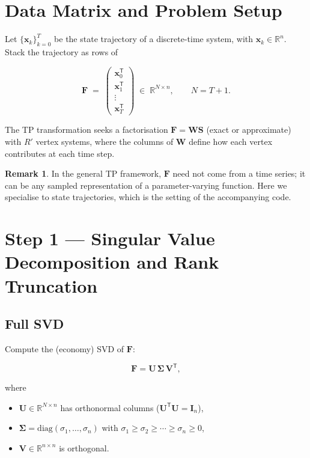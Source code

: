 \documentclass[11pt]{article}
\theoremstyle{definition}
\newtheorem{remark}{Remark}[section]
\theoremstyle{plain}
\newcommand{\R}{\mathbb{R}}
\newcommand{\mat}[1]{\mathbf{#1}}
\newcommand{\T}{\mathsf{T}}
\begin{document}
\section{Data Matrix and Problem Setup}

Let $\{\mat{x}_k\}_{k=0}^{T}$ be the state trajectory of a discrete-time
system, with $\mat{x}_k \in \R^n$.  Stack the trajectory as rows of

\begin{equation}
  \mat{F} \;=\;
  \begin{pmatrix} \mat{x}_0^\T \\ \mat{x}_1^\T \\ \vdots \\ \mat{x}_T^\T \end{pmatrix}
  \;\in\; \R^{N \times n},
  \qquad N = T+1.
  \label{eq:data_matrix}
\end{equation}

The TP transformation seeks a factorisation $\mat{F} = \mat{W}\mat{S}$
(exact or approximate) with $R'$ vertex systems, where the columns of
$\mat{W}$ define how each vertex contributes at each time step.

\begin{remark}
In the general TP framework, $\mat{F}$ need not come from a time
series; it can be any sampled representation of a parameter-varying
function.  Here we specialise to state trajectories, which is the
setting of the accompanying code.
\end{remark}


\section{Step 1 --- Singular Value Decomposition and Rank Truncation}

\subsection{Full SVD}

Compute the (economy) SVD of $\mat{F}$:

\begin{equation}
  \mat{F} = \mat{U}\,\bm{\Sigma}\,\mat{V}^\T,
  \label{eq:svd}
\end{equation}

where
\begin{itemize}
  \item $\mat{U} \in \R^{N \times n}$ has orthonormal columns
        ($\mat{U}^\T\mat{U} = \mat{I}_n$),
  \item $\bm{\Sigma} = \mathrm{diag}(\sigma_1, \ldots, \sigma_n)$ with
        $\sigma_1 \ge \sigma_2 \ge \cdots \ge \sigma_n \ge 0$,
  \item $\mat{V} \in \R^{n \times n}$ is orthogonal.
\end{itemize}
\end{document}
